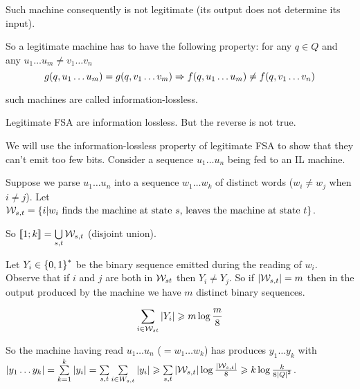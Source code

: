 Such machine consequently is not legitimate (its output does not determine its input).

\begin{corollary}
    So a legitimate machine has to have the following property: for any $q\in Q$ and any $u_1\ldots u_m \neq v_1\ldots v_n$
    \[
            g(q,u_1\ldots u_m) = g(q,v_1\ldots v_m) \Rightarrow f(q,u_1\ldots u_m) \neq f(q,v_1\ldots v_n)
    \]
\end{corollary}
such machines are called information-lossless.

Legitimate FSA are information lossless. But the reverse is not true.

We will use the information-lossless property of legitimate FSA to show that they can't emit too few bits. Consider a sequence $u_1\ldots u_n$ being fed to an IL machine.

Suppose we parse $u_1\ldots u_n$ into a sequence $w_1 \ldots w_k$ of distinct words ($w_i \neq w_j$ when $i\neq j$). Let $\mathcal{W}_{s,t} = \left\{ i \vert w_i \text{ finds the machine at state }s\text{, leaves the machine at state }t \right\}$.

So $\left\llbracket 1;k \right\rrbracket = \bigcup\limits_{s,t} \mathcal{W}_{s,t}$ (disjoint union).

Let $Y_i \in \left\{ 0,1 \right\}^*$ be the binary sequence emitted during the reading of $w_i$. Observe that if $i$ and $j$ are both in $\mathcal{W}_{st}$ then $Y_i \neq Y_j$. So if $\lvert \mathcal{W}_{s,t}\rvert = m$ then in the output produced by the machine we have $m$ distinct binary sequences.

\[
    \sum\limits_{i \in \mathcal{W}_{st}} \left\lvert Y_i\right\rvert \geqslant m\log\frac{m}{8}
\]


So the machine having read $u_1\ldots u_n$ ($=w_1\ldots w_k$) has produces $y_1\ldots y_k$ with $\left\lvert y_1\ldots y_k\right\rvert = \sum\limits_{k=1}^k \left\lvert y_i\right\rvert = \sum\limits_{s,t}\sum\limits_{i\in W_{s,t}} \left\lvert y_i\right\rvert \geqslant \sum\limits_{s,t} \left\lvert\mathcal{W}_{s,t}\right\rvert \log\frac{\left\lvert\mathcal{W}_{s,t}\right\rvert}{8}\geqslant k\log\frac{k}{8\left\lvert Q\right\rvert^2}$.


